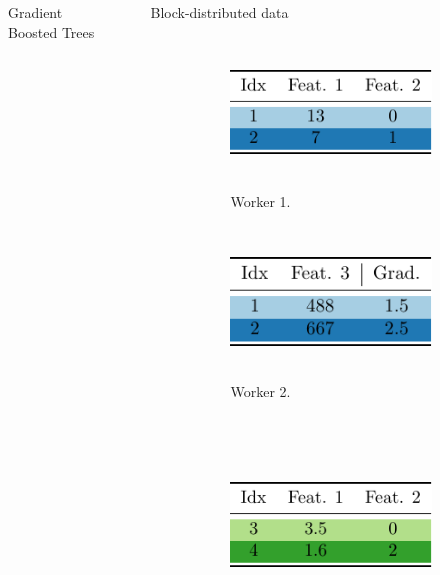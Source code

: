 \documentclass[final]{beamer}
\newlength{\sepwid}
\newlength{\onecolwid}
\begin{document}
\begin{frame}[t]
\begin{columns}[t]
\begin{column}{\onecolwid}
\begin{block}{Gradient Boosted Trees}
	\end{block}




\end{column} %

\begin{column}{\sepwid}\end{column} %

\begin{column}{\onecolwid} %
	
	\begin{block}{Block-distributed data}
		\begin{figure}
			\centering
			\begin{subfigure}[t]{0.45\onecolwid}
				\centering
				\includegraphics[height=4cm]{w1}
				\caption{Worker 1.}
			\end{subfigure}
			\quad
			\begin{subfigure}[t]{0.45\onecolwid}
				\centering
				\includegraphics[height=4cm]{w2}
				\caption{Worker 2.}
			\end{subfigure}
			\\
			\vspace{15pt}
			\begin{subfigure}[t]{0.45\onecolwid}
			\centering
			\includegraphics[height=4cm]{w3}

\end{subfigure}
\end{figure}
\end{block}
\end{column}
\end{columns}
\end{frame}
\end{document}
